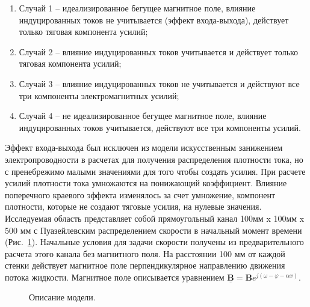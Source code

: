 \begin{enumerate}
    \item Случай 1 -- идеализированное бегущее магнитное поле, влияние индуцированных токов не учитывается (эффект входа-выхода), действует только тяговая компонента усилий;
    \item Случай 2 --  влияние индуцированных токов учитывается и действует только тяговая компонента усилий;
    \item Случай 3 -- влияние индуцированных токов не учитывается и действуют все три компоненты электромагнитных усилий;
    \item Случай 4 -- не идеализированное бегущее магнитное поле, влияние индуцированных токов учитывается, действуют все три компоненты усилий. 
\end{enumerate}

Эффект входа-выхода был исключен из модели искусственным занижением электропроводности в расчетах для получения распределения плотности тока, но с пренебрежимо малыми значениями для того чтобы создать усилия. При расчете усилий плотности тока умножаются на понижающий коэффициент. Влияние поперечного краевого эффекта изменялось за счет умножение, компонент плотности, которые не создают тяговые усилия, на нулевые значения. Исследуемая область представляет собой прямоугольный канал 100мм x 100мм x 500 мм с Пуазейлевским распределением скорости в начальный момент времени (Рис.~\ref{fig:model}). Начальные условия для задачи скорости получены из предварительного расчета этого канала без магнитного поля. На расстоянии 100 мм от каждой стенки действует магнитное поле перпендикулярное направлению движения потока жидкости. Магнитное поле описывается уравнением $\underline{\mathbf{B}} = \mathbf{B} e^{j(\omega - \varphi - \alpha x)}$.
\begin{figure}[h]
	\caption{Описание модели.}
	\label{fig:model}
\end{figure}

